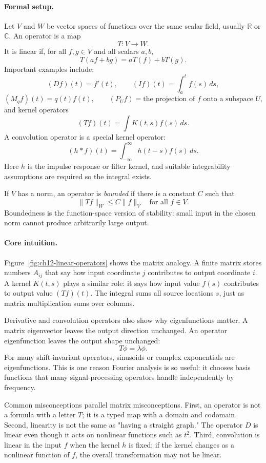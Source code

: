 \paragraph{Formal setup.}
Let \(V\) and \(W\) be vector spaces of functions over the same scalar field, usually \(\mathbb{R}\) or \(\mathbb{C}\). An operator is a map
\[
T:V\to W.
\]
It is linear if, for all \(f,g\in V\) and all scalars \(a,b\),
\[
\boxed{T(af+bg)=aT(f)+bT(g).}
\]
Important examples include:
\[
(Df)(t)=f'(t),
\qquad
(If)(t)=\int_a^t f(s)\,ds,
\]
\[
(M_qf)(t)=q(t)f(t),
\qquad
(P_Uf)=\text{the projection of }f\text{ onto a subspace }U,
\]
and kernel operators
\[
(Tf)(t)=\int K(t,s)f(s)\,ds.
\]
A convolution operator is a special kernel operator:
\[
(h*f)(t)=\int_{-\infty}^{\infty} h(t-s)f(s)\,ds.
\]
Here \(h\) is the impulse response or filter kernel, and suitable integrability assumptions are required so the integral exists.

If \(V\) has a norm, an operator is \emph{bounded} if there is a constant \(C\) such that
\[
\|Tf\|_W\leq C\|f\|_V
\quad\text{for all }f\in V.
\]
Boundedness is the function-space version of stability: small input in the chosen norm cannot produce arbitrarily large output.

\paragraph{Core intuition.}
Figure~\ref{fig:ch12-linear-operators} shows the matrix analogy. A finite matrix stores numbers \(A_{ij}\) that say how input coordinate \(j\) contributes to output coordinate \(i\). A kernel \(K(t,s)\) plays a similar role: it says how input value \(f(s)\) contributes to output value \((Tf)(t)\). The integral sums all source locations \(s\), just as matrix multiplication sums over columns.

Derivative and convolution operators also show why eigenfunctions matter. A matrix eigenvector leaves the output direction unchanged. An operator eigenfunction leaves the output shape unchanged:
\[
T\phi=\lambda\phi.
\]
For many shift-invariant operators, sinusoids or complex exponentials are eigenfunctions. This is one reason Fourier analysis is so useful: it chooses basis functions that many signal-processing operators handle independently by frequency.

Common misconceptions parallel matrix misconceptions. First, an operator is not a formula with a letter \(T\); it is a typed map with a domain and codomain. Second, linearity is not the same as "having a straight graph." The operator \(D\) is linear even though it acts on nonlinear functions such as \(t^2\). Third, convolution is linear in the input \(f\) when the kernel \(h\) is fixed; if the kernel changes as a nonlinear function of \(f\), the overall transformation may not be linear.

